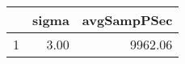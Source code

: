\begin{table}[h]
\centering
\begin{tabular}{rrr}
  \hline
 & sigma & avgSampPSec \\ 
  \hline
1 & 3.00 & 9962.06 \\ 
   \hline
\end{tabular}
\end{table}
